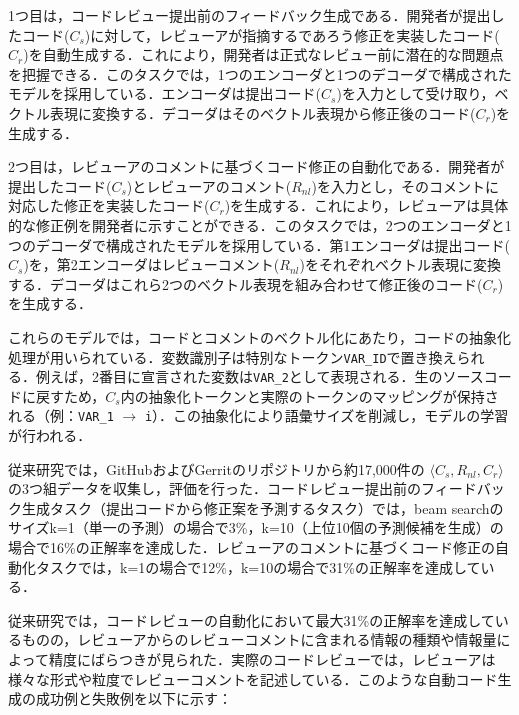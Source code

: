 \documentclass[11pt]{jreport}
\begin{document}
1つ目は，コードレビュー提出前のフィードバック生成である．開発者が提出したコード($C_s$)に対して，レビューアが指摘するであろう修正を実装したコード($C_r$)を自動生成する．これにより，開発者は正式なレビュー前に潜在的な問題点を把握できる．このタスクでは，1つのエンコーダと1つのデコーダで構成されたモデルを採用している．エンコーダは提出コード($C_s$)を入力として受け取り，ベクトル表現に変換する．デコーダはそのベクトル表現から修正後のコード($C_r$)を生成する．

2つ目は，レビューアのコメントに基づくコード修正の自動化である．開発者が提出したコード($C_s$)とレビューアのコメント($R_{nl}$)を入力とし，そのコメントに対応した修正を実装したコード($C_r$)を生成する．これにより，レビューアは具体的な修正例を開発者に示すことができる．このタスクでは，2つのエンコーダと1つのデコーダで構成されたモデルを採用している．第1エンコーダは提出コード($C_s$)を，第2エンコーダはレビューコメント($R_{nl}$)をそれぞれベクトル表現に変換する．デコーダはこれら2つのベクトル表現を組み合わせて修正後のコード($C_r$)を生成する．

これらのモデルでは，コードとコメントのベクトル化にあたり，コードの抽象化処理が用いられている．変数識別子は特別なトークン\texttt{VAR\_ID}で置き換えられる．例えば，2番目に宣言された変数は\texttt{VAR\_2}として表現される．生のソースコードに戻すため，$C_s$内の抽象化トークンと実際のトークンのマッピングが保持される（例：\texttt{VAR\_1} $\rightarrow$ \texttt{i}）．この抽象化により語彙サイズを削減し，モデルの学習が行われる．

従来研究では，GitHubおよびGerritのリポジトリから約17,000件の $\langle C_s, R_{nl}, C_r \rangle$ の3つ組データを収集し，評価を行った．コードレビュー提出前のフィードバック生成タスク（提出コードから修正案を予測するタスク）では，beam searchのサイズk=1（単一の予測）の場合で3\%，k=10（上位10個の予測候補を生成）の場合で16\%の正解率を達成した．レビューアのコメントに基づくコード修正の自動化タスクでは，k=1の場合で12\%，k=10の場合で31\%の正解率を達成している．

従来研究では，コードレビューの自動化において最大31\%の正解率を達成しているものの，レビューアからのレビューコメントに含まれる情報の種類や情報量によって精度にばらつきが見られた．実際のコードレビューでは，レビューアは様々な形式や粒度でレビューコメントを記述している．このような自動コード生成の成功例と失敗例を以下に示す：
\end{document}
